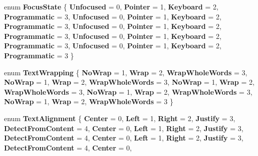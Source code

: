 \begin{DoxyCompactItemize}
enum {\bfseries Focus\+State} \{ \newline
{\bfseries Unfocused} = 0, 
{\bfseries Pointer} = 1, 
{\bfseries Keyboard} = 2, 
{\bfseries Programmatic} = 3, 
\newline
{\bfseries Unfocused} = 0, 
{\bfseries Pointer} = 1, 
{\bfseries Keyboard} = 2, 
{\bfseries Programmatic} = 3, 
\newline
{\bfseries Unfocused} = 0, 
{\bfseries Pointer} = 1, 
{\bfseries Keyboard} = 2, 
{\bfseries Programmatic} = 3, 
\newline
{\bfseries Unfocused} = 0, 
{\bfseries Pointer} = 1, 
{\bfseries Keyboard} = 2, 
{\bfseries Programmatic} = 3, 
\newline
{\bfseries Unfocused} = 0, 
{\bfseries Pointer} = 1, 
{\bfseries Keyboard} = 2, 
{\bfseries Programmatic} = 3
 \}
\item 
\mbox{\label{namespace_windows_1_1_u_i_1_1_xaml_aa8ebfd3700e5b390858676152a8a58e9}} 
enum {\bfseries Text\+Wrapping} \{ \newline
{\bfseries No\+Wrap} = 1, 
{\bfseries Wrap} = 2, 
{\bfseries Wrap\+Whole\+Words} = 3, 
{\bfseries No\+Wrap} = 1, 
\newline
{\bfseries Wrap} = 2, 
{\bfseries Wrap\+Whole\+Words} = 3, 
{\bfseries No\+Wrap} = 1, 
{\bfseries Wrap} = 2, 
\newline
{\bfseries Wrap\+Whole\+Words} = 3, 
{\bfseries No\+Wrap} = 1, 
{\bfseries Wrap} = 2, 
{\bfseries Wrap\+Whole\+Words} = 3, 
\newline
{\bfseries No\+Wrap} = 1, 
{\bfseries Wrap} = 2, 
{\bfseries Wrap\+Whole\+Words} = 3
 \}
\item 
\mbox{\label{namespace_windows_1_1_u_i_1_1_xaml_a096a1b0a726ae821c5a11e30eb861b63}} 
enum {\bfseries Text\+Alignment} \{ \newline
{\bfseries Center} = 0, 
{\bfseries Left} = 1, 
{\bfseries Right} = 2, 
{\bfseries Justify} = 3, 
\newline
{\bfseries Detect\+From\+Content} = 4, 
{\bfseries Center} = 0, 
{\bfseries Left} = 1, 
{\bfseries Right} = 2, 
\newline
{\bfseries Justify} = 3, 
{\bfseries Detect\+From\+Content} = 4, 
{\bfseries Center} = 0, 
{\bfseries Left} = 1, 
\newline
{\bfseries Right} = 2, 
{\bfseries Justify} = 3, 
{\bfseries Detect\+From\+Content} = 4, 
{\bfseries Center} = 0, 

\end{DoxyCompactItemize}
